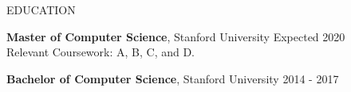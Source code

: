 \documentclass{resume} %
\begin{document}

\begin{rSection}{EDUCATION}

    {\bf Master of Computer Science}, Stanford University \hfill {Expected 2020}\\
    Relevant Coursework: A, B, C, and D.
    
    {\bf Bachelor of Computer Science}, Stanford University \hfill {2014 - 2017}

\end{rSection}
\end{document}
